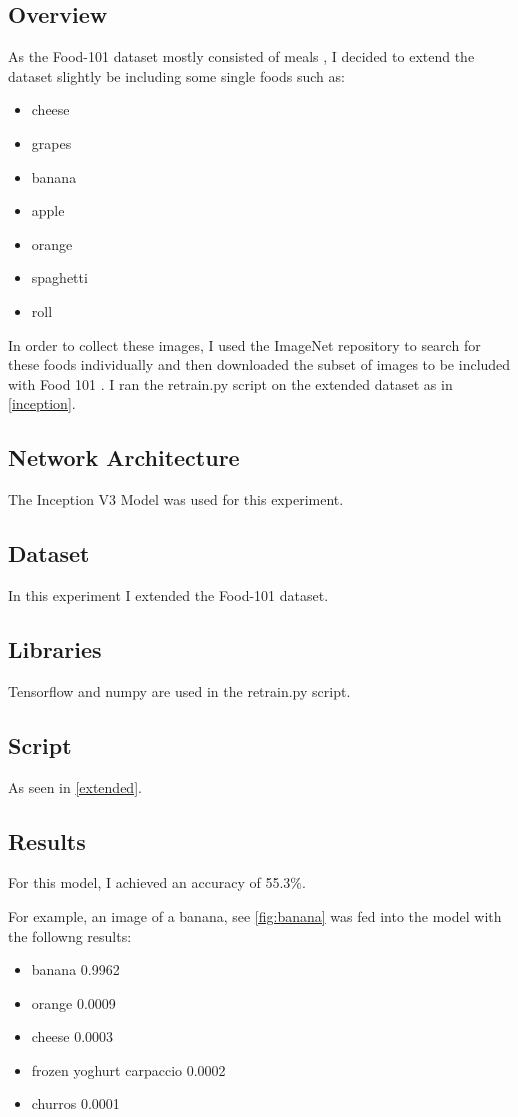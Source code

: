 \subsection*{Overview}
As the Food-101 dataset mostly consisted of meals \textcite{food101}, I decided to extend the
dataset slightly be including some single foods such as:
\begin{itemize}
    \item{cheese}
    \item{grapes}
    \item{banana}
    \item{apple}
    \item{orange}
    \item{spaghetti}
    \item{roll}
\end{itemize}

In order to collect these images, I used the ImageNet repository to search for
these foods individually and then downloaded the subset of images to be included
with Food 101 \textcite{imagenet}. I ran the retrain.py script on the extended dataset as in
\ref{inception}.

\subsection*{Network Architecture}
The Inception V3 Model was used for this experiment.

\subsection*{Dataset}
In this experiment I extended the Food-101 dataset.

\subsection*{Libraries}
Tensorflow and numpy are used in the retrain.py script.

\subsection*{Script}
As seen in \ref{extended}.

\subsection*{Results}
For this model, I achieved an accuracy of 55.3\%.

For example, an image of a banana, see \ref{fig:banana} was fed into the model with
the followng results:
\begin{itemize}
    \item{banana 0.9962}
    \item{orange 0.0009}
    \item{cheese 0.0003}
    \item{frozen yoghurt carpaccio 0.0002}
    \item{churros 0.0001}
\end{itemize}
 
